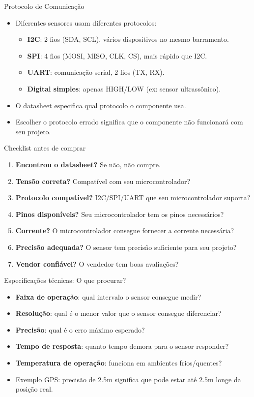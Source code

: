 \documentclass[10pt]{beamer}
\begin{document}
\begin{frame}{Protocolo de Comunicação}
  \begin{itemize}
    \item Diferentes sensores usam diferentes protocolos:
    \begin{itemize}
      \item \textbf{I2C}: 2 fios (SDA, SCL), vários dispositivos no mesmo barramento.
      \item \textbf{SPI}: 4 fios (MOSI, MISO, CLK, CS), mais rápido que I2C.
      \item \textbf{UART}: comunicação serial, 2 fios (TX, RX).
      \item \textbf{Digital simples}: apenas HIGH/LOW (ex: sensor ultrassônico).
    \end{itemize}
    \item O datasheet especifica qual protocolo o componente usa.
    \item Escolher o protocolo errado significa que o componente não funcionará com seu projeto.
  \end{itemize}
\end{frame}

\begin{frame}{Checklist antes de comprar}
  \begin{enumerate}
    \item \textbf{Encontrou o datasheet?} Se não, não compre.
    \item \textbf{Tensão correta?} Compatível com seu microcontrolador?
    \item \textbf{Protocolo compatível?} I2C/SPI/UART que seu microcontrolador suporta?
    \item \textbf{Pinos disponíveis?} Seu microcontrolador tem os pinos necessários?
    \item \textbf{Corrente?} O microcontrolador consegue fornecer a corrente necessária?
    \item \textbf{Precisão adequada?} O sensor tem precisão suficiente para seu projeto?
    \item \textbf{Vendor confiável?} O vendedor tem boas avaliações?
  \end{enumerate}
\end{frame}

\begin{frame}{Especificações técnicas: O que procurar?}
  \begin{itemize}
    \item \textbf{Faixa de operação}: qual intervalo o sensor consegue medir?
    \item \textbf{Resolução}: qual é o menor valor que o sensor consegue diferenciar?
    \item \textbf{Precisão}: qual é o erro máximo esperado?
    \item \textbf{Tempo de resposta}: quanto tempo demora para o sensor responder?
    \item \textbf{Temperatura de operação}: funciona em ambientes frios/quentes?
    \item Exemplo GPS: precisão de 2.5m significa que pode estar até 2.5m longe da posição real.
  \end{itemize}
\end{frame}
\end{document}
